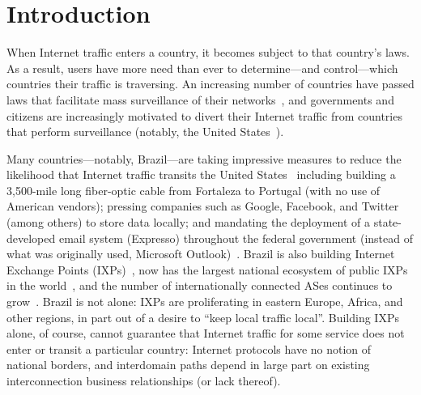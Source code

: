 \section{Introduction}
\label{intro}

When Internet traffic enters a country, it becomes subject to that
country's laws.  As a result, users have more need than ever to
determine---and control---which countries their traffic is traversing.
An increasing number of countries have passed laws that facilitate mass
surveillance of their networks~\cite{france_surveillance,
  netherlands_surveillance, kazak_surveillance, uk_bill}, and governments
and citizens are increasingly motivated to divert their Internet traffic
from countries that perform surveillance (notably, the United
States~\cite{russia_secure_internet,
  routing_errors, dte}).

Many countries---notably, Brazil---are taking impressive measures to reduce
the likelihood that Internet traffic transits the United
States~\cite{brazil_history, brazil_break_from_US, brazil_conference,
  brazil_conference2, brazil_human_rights} including building a 3,500-mile
 long fiber-optic cable from Fortaleza to Portugal (with no use of
American vendors); pressing companies such as Google, Facebook, and
Twitter (among others) to store data locally; and mandating the deployment of a state-developed email system (Expresso) throughout the federal government (instead of what was originally used, Microsoft Outlook)~\cite{brazil_cable, brazil_us_companies}.  Brazil is also
building Internet Exchange Points (IXPs)~\cite{brazil_IXP1}, now has the
largest national ecosystem of public IXPs in
the world~\cite{brazil_ixp_ecosystem}, and the number of internationally
connected ASes continues to
grow~\cite{brazil_international_ases}. Brazil is not alone: IXPs are
proliferating in eastern Europe, Africa, and other regions, in part out
of a desire to ``keep local traffic local''. Building IXPs alone, of
course, cannot guarantee that Internet traffic for some service does not
enter or transit a particular country: Internet protocols have no notion
of national borders, and interdomain paths depend in large part on
existing interconnection business relationships (or lack thereof). 

